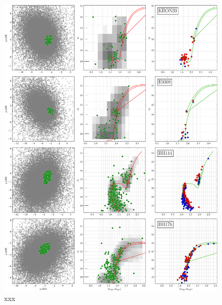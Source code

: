 \documentclass[referee]{aa}
\begin{document}
\begin{appendix}
 \begin{figure}
  \centering
  \includegraphics[height=.95\textheight]{figs/16_fpars.png}
  \caption{xxx}
  \label{fig:16fpars}
 \end{figure}


\end{appendix}
\end{document}
